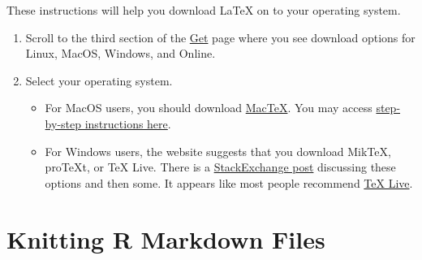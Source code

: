 \documentclass[
]{book}
\begin{document}
These instructions will help you download LaTeX on to your operating system.

\begin{enumerate}
\def\labelenumi{\arabic{enumi}.}
\item
  Scroll to the third section of the \href{https://www.latex-project.org/get/}{Get} page where you see download options for Linux, MacOS, Windows, and Online.
\item
  Select your operating system.

  \begin{itemize}
  \item
    For MacOS users, you should download \href{http://www.tug.org/mactex/}{MacTeX}. You may access \href{http://www.tug.org/mactex/mactex-download.html}{step-by-step instructions here}.
  \item
    For Windows users, the website suggests that you download MikTeX, proTeXt, or TeX Live. There is a \href{https://tex.stackexchange.com/questions/239199/latex-distributions-what-are-their-main-differences}{StackExchange post} discussing these options and then some. It appears like most people recommend \href{http://tug.org/texlive/}{TeX Live}.
  \end{itemize}
\end{enumerate}

\hypertarget{knit-RMarkdown}{%
\section{Knitting R Markdown Files}\label{knit-RMarkdown}}
\end{document}
